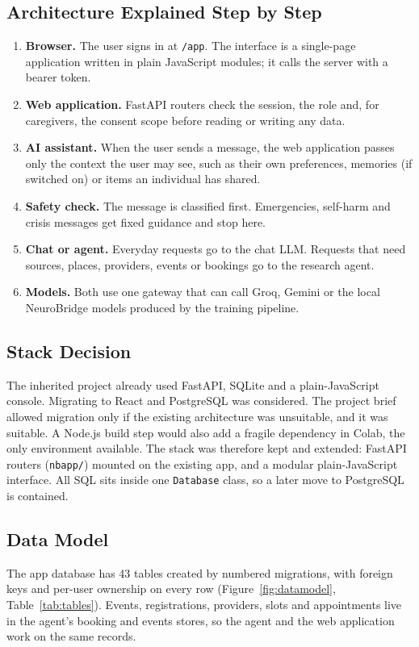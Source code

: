 \documentclass[11pt,a4paper]{article}
\newcommand{\code}[1]{\texttt{#1}}
\begin{document}
\subsection{Architecture Explained Step by Step}
\begin{enumerate}
  \item \textbf{Browser.} The user signs in at \code{/app}. The interface is a single-page application written in plain JavaScript modules; it calls the server with a bearer token.
  \item \textbf{Web application.} FastAPI routers check the session, the role and, for caregivers, the consent scope before reading or writing any data.
  \item \textbf{AI assistant.} When the user sends a message, the web application passes only the context the user may see, such as their own preferences, memories (if switched on) or items an individual has shared.
  \item \textbf{Safety check.} The message is classified first. Emergencies, self-harm and crisis messages get fixed guidance and stop here.
  \item \textbf{Chat or agent.} Everyday requests go to the chat LLM. Requests that need sources, places, providers, events or bookings go to the research agent.
  \item \textbf{Models.} Both use one gateway that can call Groq, Gemini or the local NeuroBridge models produced by the training pipeline.
\end{enumerate}

\subsection{Stack Decision}
The inherited project already used FastAPI, SQLite and a plain-JavaScript console. Migrating to
React and PostgreSQL was considered. The project brief allowed migration only if the existing architecture was
unsuitable, and it was suitable. A Node.js build step would also add a fragile dependency in Colab, the only
environment available. The stack was therefore kept and extended: FastAPI routers (\code{nbapp/})
mounted on the existing app, and a modular plain-JavaScript interface. All SQL sits inside one
\code{Database} class, so a later move to PostgreSQL is contained.

\subsection{Data Model}
The app database has 43 tables created by numbered migrations, with foreign keys and per-user ownership
on every row (Figure~\ref{fig:datamodel}, Table~\ref{tab:tables}). Events, registrations, providers,
slots and appointments live in the agent's booking and events stores, so the agent and the web
application work on the same records.
\end{document}
